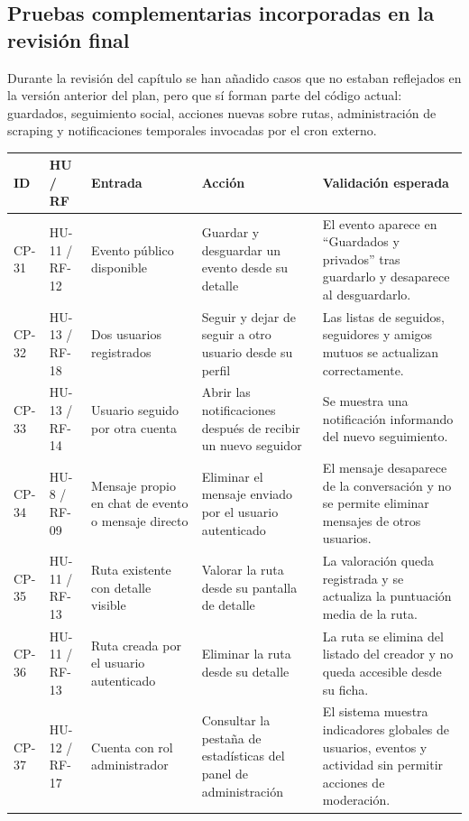 \subsection{Pruebas complementarias incorporadas en la revisión final}

Durante la revisión del capítulo se han añadido casos que no estaban reflejados en la versión anterior del plan, pero que sí forman parte del código actual: guardados, seguimiento social, acciones nuevas sobre rutas, administración de scraping y notificaciones temporales invocadas por el cron externo.

\begin{longtable}{|L{1.3cm}|L{1.6cm}|L{3cm}|L{3.8cm}|L{4.3cm}|}
\hline
\textbf{ID} & \textbf{HU / RF} & \textbf{Entrada} & \textbf{Acción} & \textbf{Validación esperada} \\
\hline
{}\label{cp:31}CP-31 & HU-11 / RF-12 & Evento público disponible & Guardar y desguardar un evento desde su detalle & El evento aparece en ``Guardados y privados'' tras guardarlo y desaparece al desguardarlo. \\
\hline
{}\label{cp:32}CP-32 & HU-13 / RF-18 & Dos usuarios registrados & Seguir y dejar de seguir a otro usuario desde su perfil & Las listas de seguidos, seguidores y amigos mutuos se actualizan correctamente. \\
\hline
{}\label{cp:33}CP-33 & HU-13 / RF-14 & Usuario seguido por otra cuenta & Abrir las notificaciones después de recibir un nuevo seguidor & Se muestra una notificación informando del nuevo seguimiento. \\
\hline
{}\label{cp:34}CP-34 & HU-8 / RF-09 & Mensaje propio en chat de evento o mensaje directo & Eliminar el mensaje enviado por el usuario autenticado & El mensaje desaparece de la conversación y no se permite eliminar mensajes de otros usuarios. \\
\hline
{}\label{cp:35}CP-35 & HU-11 / RF-13 & Ruta existente con detalle visible & Valorar la ruta desde su pantalla de detalle & La valoración queda registrada y se actualiza la puntuación media de la ruta. \\
\hline
{}\label{cp:36}CP-36 & HU-11 / RF-13 & Ruta creada por el usuario autenticado & Eliminar la ruta desde su detalle & La ruta se elimina del listado del creador y no queda accesible desde su ficha. \\
\hline
{}\label{cp:37}CP-37 & HU-12 / RF-17 & Cuenta con rol administrador & Consultar la pestaña de estadísticas del panel de administración & El sistema muestra indicadores globales de usuarios, eventos y actividad sin permitir acciones de moderación. \\

\end{longtable}
